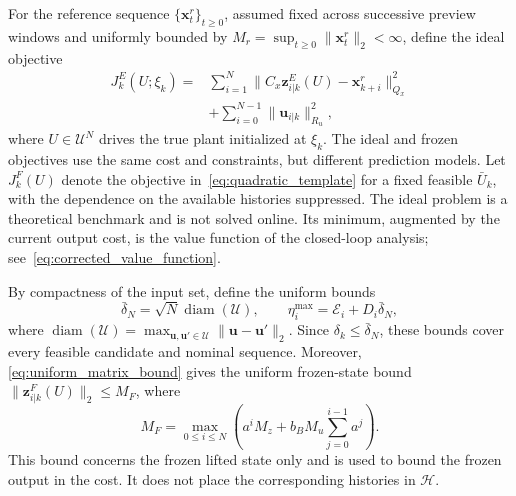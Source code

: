\documentclass[journal]{IEEEtran}
\newcommand{\vx}{\mathbf{x}}
\newcommand{\vu}{\mathbf{u}}
\newcommand{\vz}{\mathbf{z}}
\newcommand{\norm}[2][]{\mathopen{#1\lVert}#2\mathclose{#1\rVert}}
\theoremstyle{plain}
\theoremstyle{definition}
\theoremstyle{definition}
\begin{document}
For the reference sequence $\{\vx_t^r\}_{t\ge0}$, assumed fixed across
successive preview windows and uniformly bounded by
$M_r=\sup_{t\ge0}\norm{\vx_t^r}_2<\infty$, define the ideal objective
\begin{equation}
\begin{aligned}
J_k^E(U;\xi_k)={}&\sum_{i=1}^N
\norm{C_x\vz_{i|k}^E(U)-\vx_{k+i}^r}_{Q_x}^2\\
&+\sum_{i=0}^{N-1}\norm{\vu_{i|k}}_{R_u}^2,
\end{aligned}
\label{eq:ideal_objective}
\end{equation}
where $U\in\mathcal U^N$ drives the true plant initialized at $\xi_k$.
The ideal and frozen objectives use the same cost and constraints,
but different prediction models. Let $J_k^F(U)$ denote the objective
in~\eqref{eq:quadratic_template} for a fixed feasible $\bar U_k$, with
the dependence on the available histories suppressed. The ideal
problem is a theoretical benchmark and is not solved online. Its
minimum, augmented by the current output cost, is the value function
of the closed-loop analysis; see~\eqref{eq:corrected_value_function}.

By compactness of the input set, define the uniform bounds
\begin{equation}
\bar\delta_N=\sqrt{N}\operatorname{diam}(\mathcal U),\qquad
\eta_i^{\max}=\mathcal E_i+D_i\bar\delta_N,
\label{eq:uniform_prediction_mismatch}
\end{equation}
where $\operatorname{diam}(\mathcal U)=\max_{\vu,\vu'\in\mathcal U}
\norm{\vu-\vu'}_2$. Since $\delta_k\le\bar\delta_N$, these bounds
cover every feasible candidate and nominal sequence. Moreover,
\eqref{eq:uniform_matrix_bound} gives the uniform frozen-state bound
$\norm{\vz_{i|k}^F(U)}_2\le M_F$, where
\begin{equation}
M_F=\max_{0\le i\le N}\left(a^iM_z+b_BM_u\sum_{j=0}^{i-1}a^j\right).
\label{eq:frozen_state_bound}
\end{equation}
This bound concerns the frozen lifted state only and is used to bound
the frozen output in the cost. It does not place the corresponding
histories in $\mathcal H$.
\end{document}
